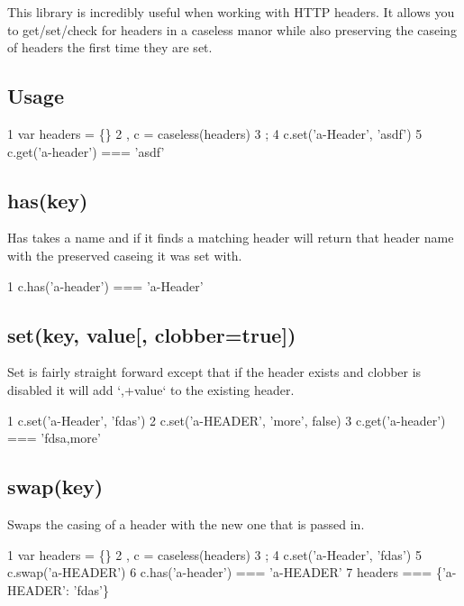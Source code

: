 This library is incredibly useful when working with H\+T\+T\+P headers. It allows you to get/set/check for headers in a caseless manor while also preserving the caseing of headers the first time they are set.

\subsection*{Usage}


\begin{DoxyCode}
1 var headers = \{\}
2   , c = caseless(headers)
3   ;
4 c.set('a-Header', 'asdf')
5 c.get('a-header') === 'asdf'
\end{DoxyCode}


\subsection*{has(key)}

Has takes a name and if it finds a matching header will return that header name with the preserved caseing it was set with.


\begin{DoxyCode}
1 c.has('a-header') === 'a-Header'
\end{DoxyCode}


\subsection*{set(key, value\mbox{[}, clobber=true\mbox{]})}

Set is fairly straight forward except that if the header exists and clobber is disabled it will add `\textquotesingle{},\textquotesingle{}+value` to the existing header.


\begin{DoxyCode}
1 c.set('a-Header', 'fdas')
2 c.set('a-HEADER', 'more', false)
3 c.get('a-header') === 'fdsa,more'
\end{DoxyCode}


\subsection*{swap(key)}

Swaps the casing of a header with the new one that is passed in.


\begin{DoxyCode}
1 var headers = \{\}
2   , c = caseless(headers)
3   ;
4 c.set('a-Header', 'fdas')
5 c.swap('a-HEADER')
6 c.has('a-header') === 'a-HEADER'
7 headers === \{'a-HEADER': 'fdas'\}
\end{DoxyCode}
 